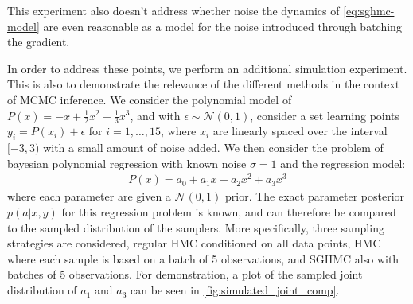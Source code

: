 This experiment also doesn't address whether noise the dynamics of \cref{eq:sghmc-model} are even reasonable as a model for the noise introduced through batching the gradient. 

In order to address these points, we perform an additional simulation experiment. 
This is also to demonstrate the relevance of the different methods in the context of MCMC inference.
We consider the polynomial model of $P(x) = -x + \frac{1}{2}x^2 + \frac{1}{3}x^3$, 
and with $\epsilon \sim \mathcal{N}(0, 1)$, 
consider a set learning points $y_i = P(x_i) + \epsilon$ for $i=1,\dots,15$, where $x_i$ are linearly spaced over the interval $[-3, 3)$ with a small amount of noise added. 
We then consider the problem of bayesian polynomial regression with known noise $\sigma=1$ and the regression model:
\begin{align*}
    P(x) = a_0 + a_1 x+a_2 x^2 + a_3 x^3
\end{align*}
where each parameter are given a $\mathcal{N}(0, 1)$ prior. The exact parameter posterior $p(a|x,y)$ for this regression problem is known, and can therefore be compared to the sampled distribution of the samplers. 
More specifically, three sampling strategies are considered, regular HMC conditioned on all data points, HMC where each sample is based on a batch of 5 observations, and SGHMC also with batches of 5 observations. For demonstration, a plot of the sampled joint distribution of $a_1$ and $a_3$ can be seen in \cref{fig:simulated_joint_comp}.
